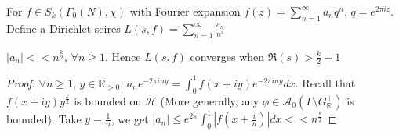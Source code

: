 \documentclass[main]{subfiles}
\begin{document}
\begin{definition}
For $f\in S_k(\Gamma_0(N),\chi)$ with Fourier expansion $f(z)=\sum_{n=1}^\infty a_nq^n$, $q=e^{2\pi iz}$. Define a Dirichlet seires $L(s,f)=\sum_{n=1}^\infty\frac{a_n}{n^s}$
\end{definition}

\begin{lemma}
$|a_n|<<n^{\frac{k}{2}}$, $\forall n\geq1$. Hence $L(s,f)$ converges when $\Re(s)>\frac{k}{2}+1$
\end{lemma}

\begin{proof}
$\forall n\geq1$, $y\in\mathbb R_{>0}$, $a_ne^{-2\pi iny}=\int_0^1f(x+iy)e^{-2\pi iny}dx$. Recall that $f(x+iy)y^{\frac{k}{2}}$ is bounded on $\mathcal H$ (More generally, any $\phi\in\mathcal A_0(\Gamma\setminus G^+_{\mathbb R})$ is bounded). Take $y=\frac{1}{n}$, we get $|a_n|\leq e^{2\pi}\int_0^1|f(x+\frac{i}{n})|dx<<n^{\frac{k}{2}}$
\end{proof}

\begin{definition}

\end{definition}
\end{document}
